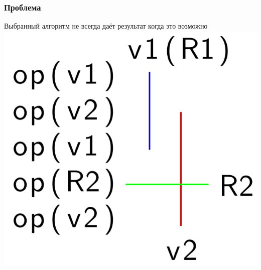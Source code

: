 \documentclass[10pt,a4paper]{beamer}
\begin{document}
\begin{frame}[fragile]
    \frametitle{Проблема}

    Выбранный алгоритм не всегда даёт результат когда это возможно
    \includegraphics[scale=0.4]{fail_when_possible.png}
\end{frame}
\end{document}
